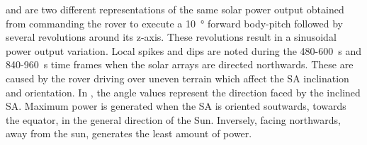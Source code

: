  and  are two different representations of the same solar power output obtained from commanding the rover to execute a \SI{10}{\degree} forward body-pitch followed by several revolutions around its z-axis. These revolutions result in a sinusoidal power output variation. Local spikes and dips are noted during the 480-\SI{600}{\second} and 840-\SI{960}{\second} time frames when the solar arrays are directed northwards. These are caused by the rover driving over uneven terrain which affect the \ac{SA} inclination and orientation. In , the angle values represent the direction faced by the inclined \ac{SA}. Maximum power is generated when the \ac{SA} is oriented soutwards, towards the equator, in the general direction of the Sun. Inversely, facing northwards, away from the sun, generates the least amount of power.

